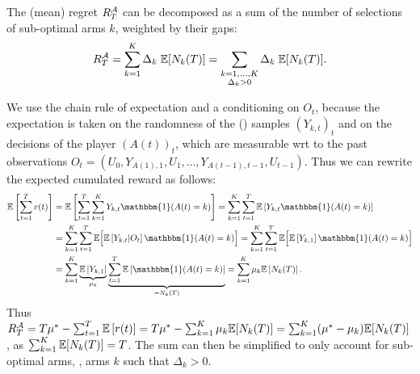 \begin{proposition}\label{prop:2:RegretDecomposition}
\begin{leftbar}[propositionbar]  %
    The (mean) regret $R_T^{\mathcal{A}}$ can be decomposed as a sum of the number of selections of sub-optimal arms $k$, weighted by their gaps:
    \begin{align}\label{eq:2:RegretDecomposition}
        R_T^{\mathcal{A}} = \sum_{k=1}^K \Delta_k \; \mathbb{E}[ N_k(T) ]
        = \sum_{\substack{k=1,\dots,K\\\Delta_k > 0}} \Delta_k \; \mathbb{E}[ N_k(T) ].
    \end{align}
\end{leftbar}  %
\end{proposition}
%
\begin{smallproof}\label{proof:2:RegretDecomposition}
    We use the chain rule of expectation and a conditioning on $O_t$,
    because the expectation is taken on the randomness of the (\iid) samples $(Y_{k,t})_t$ and on the decisions of the player $(A(t))_t$, which are measurable wrt to the past observations $O_t = (U_0, Y_{A(1),1}, U_1, \dots, Y_{A(t-1),t-1}, U_{t-1})$.
    Thus we can rewrite the expected cumulated reward as follows:
    \begin{align*}
        \E \left[ \sum_{t=1}^T r(t) \right]
        &= \E \left[ \sum_{t=1}^T \sum_{k=1}^K Y_{k,t} \mathbbm{1}(A(t) = k) \right]
        = \sum_{k=1}^K \sum_{t=1}^T \E \left[ Y_{k,t} \mathbbm{1}(A(t) = k) \right] \\
        &= \sum_{k=1}^K \sum_{t=1}^T \E \Bigl[ \E \left[ Y_{k,t} | O_t \right] \mathbbm{1}(A(t) = k) \Bigr]
        = \sum_{k=1}^K \sum_{t=1}^T \E \Bigl[ \E \left[ Y_{k,1} \right] \mathbbm{1}(A(t) = k) \Bigr] \\
        &= \sum_{k=1}^K \underbrace{\E \left[ Y_{k,1} \right]}_{\mu_k} \underbrace{\sum_{t=1}^T \E \left[ \mathbbm{1}(A(t) = k) \right]}_{= N_k(T)}
        = \sum_{k=1}^K \mu_k \E \left[ N_k(T) \right].
    \end{align*}
    Thus $R_T^{\mathcal{A}} = T \mu^* - \sum_{t=1}^T \mathbb{E}\left[ r(t) \right] = T \mu^* - \sum_{k=1}^K \mu_k \mathbb{E}[ N_k(T) ] = \sum_{k=1}^K (\mu^* - \mu_k) \mathbb{E}[ N_k(T) ]$,
    as $\sum_{k=1}^K  \mathbb{E}[ N_k(T) ] = T$.
    The sum can then be simplified to only account for sub-optimal arms, \ie, arms $k$ such that $\Delta_k > 0$.
\end{smallproof}


